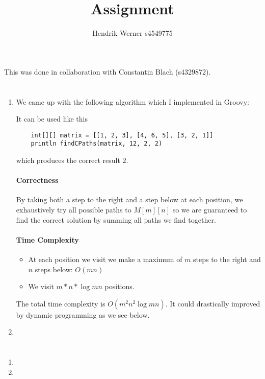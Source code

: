\documentclass[12pt, a4paper]{article}
\title{Assignment}
\author{Hendrik Werner s4549775}
\begin{document}
\maketitle

This was done in collaboration with Constantin Blach (s4329872).

\section{} %

\section{} %
\begin{enumerate}[a]
	\item %
	We came up with the following algorithm which I implemented in Groovy:

	

	It can be used like this

	\begin{lstlisting}
	int[][] matrix = [[1, 2, 3], [4, 6, 5], [3, 2, 1]]
	println findCPaths(matrix, 12, 2, 2)
	\end{lstlisting}

	which produces the correct result $2$.

	\paragraph{Correctness}

	By taking both a step to the right and a step below at each position, we exhaustively try all possible paths to $M[m][n]$ so we are guaranteed to find the correct solution by summing all paths we find together.

	\paragraph{Time Complexity}

	\begin{itemize}
		\item At each position we visit we make a maximum of $m$ steps to the right and $n$ steps below: $O(mn)$
		\item We visit $m * n * \log mn$ positions.
	\end{itemize}

	The total time complexity is $O(m^2 n^2 \log mn)$. It could drastically improved by dynamic programming as we see below.

	\item %
\end{enumerate}

\section{} %
\begin{enumerate}[a]
	\item %
	\item %
\end{enumerate}
\end{document}
